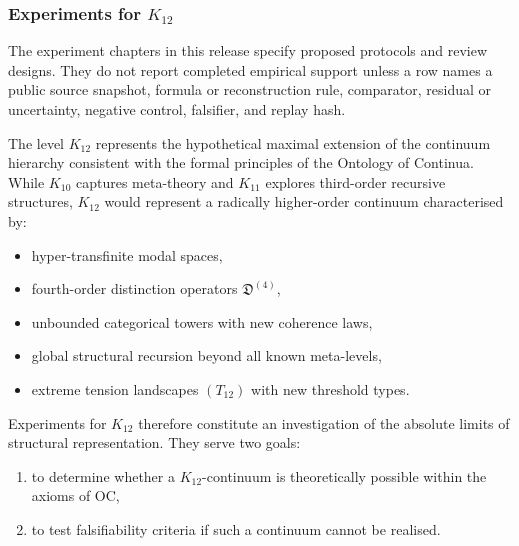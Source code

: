
\subsubsection{Experiments for $K_{12}$}

The experiment chapters in this release specify proposed protocols and review designs. They do not report completed empirical support unless a row names a public source snapshot, formula or reconstruction rule, comparator, residual or uncertainty, negative control, falsifier, and replay hash.
\label{sec:experiments-k12}

The level $K_{12}$ represents the hypothetical maximal extension of
the continuum hierarchy consistent with the formal principles of the
Ontology of Continua.
While $K_{10}$ captures meta-theory and $K_{11}$ explores
third-order recursive structures, $K_{12}$ would represent a
radically higher-order continuum characterised by:

\begin{itemize}
    \item hyper-transfinite modal spaces,
    \item fourth-order distinction operators $\mathfrak{D}^{(4)}$,
    \item unbounded categorical towers with new coherence laws,
    \item global structural recursion beyond all known meta-levels,
    \item extreme tension landscapes $(T_{12})$ with new threshold types.
\end{itemize}

Experiments for $K_{12}$ therefore constitute an investigation of the
absolute limits of structural representation.
They serve two goals:

\begin{enumerate}
    \item to determine whether a $K_{12}$-continuum is theoretically
          possible within the axioms of OC,
    \item to test falsifiability criteria if such a continuum
          cannot be realised.
\end{enumerate}



